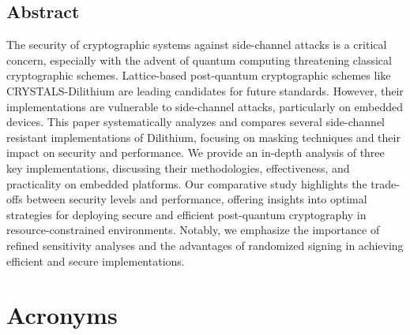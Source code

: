 \documentclass[a4paper,12pt,oneside,openany,headsepline,bibliography=totocnumbered]{scrbook}
\begin{document}


\section*{Abstract}
\thispagestyle{abstract}

The security of cryptographic systems against side-channel attacks is a critical concern, especially with the advent of quantum computing threatening classical cryptographic schemes. Lattice-based post-quantum cryptographic schemes like CRYSTALS-Dilithium are leading candidates for future standards. However, their implementations are vulnerable to side-channel attacks, particularly on embedded devices. This paper systematically analyzes and compares several side-channel resistant implementations of Dilithium, focusing on masking techniques and their impact on security and performance. We provide an in-depth analysis of three key implementations, discussing their methodologies, effectiveness, and practicality on embedded platforms. Our comparative study highlights the trade-offs between security levels and performance, offering insights into optimal strategies for deploying secure and efficient post-quantum cryptography in resource-constrained environments. Notably, we emphasize the importance of refined sensitivity analyses and the advantages of randomized signing in achieving efficient and secure implementations.

\tableofcontents
\thispagestyle{contents}

\chapter*{Acronyms}
\thispagestyle{acronyms}
\begin{acronym}[PQC]
\end{acronym}








\newpage
\listoffigures
\thispagestyle{listsoffigures}

\listoftables
\thispagestyle{listoftables}

\newpage


\thispagestyle{bibliography}
\end{document}
